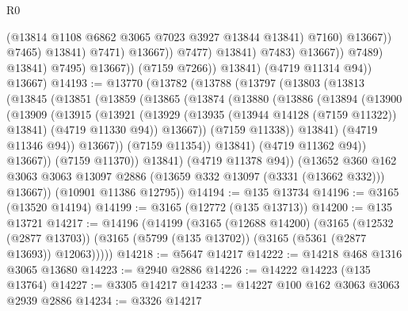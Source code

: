 \begin{lexlean}{R0}
\begin{coremodule}
                                                (@13814 @1108 @6862 @3065 @7023 @3927 @13844 @13841)
                                                @7160)
                                              @13667))
                                          @7465)
                                        @13841)
                                      @7471)
                                    @13667))
                                @7477)
                              @13841)
                            @7483)
                          @13667))
                      @7489)
                    @13841)
                  @7495)
                @13667))
            (@7159 @7266))
          @13841)
        (@4719 @11314 @94))
      @13667)
@14193 := @13770
    (@13782
      (@13788
        (@13797
          (@13803
            (@13813
              (@13845
                (@13851
                  (@13859
                    (@13865
                      (@13874
                        (@13880
                          (@13886
                            (@13894
                              (@13900
                                (@13909
                                  (@13915
                                    (@13921
                                      (@13929
                                        (@13935 (@13944 @14128 (@7159 @11322)) @13841)
                                        (@4719 @11330 @94))
                                      @13667))
                                  (@7159 @11338))
                                @13841)
                              (@4719 @11346 @94))
                            @13667))
                        (@7159 @11354))
                      @13841)
                    (@4719 @11362 @94))
                  @13667))
              (@7159 @11370))
            @13841)
          (@4719 @11378 @94))
        (@13652
          @360
          @162
          @3063
          @3063
          @13097
          @2886
          (@13659 @332 @13097 (@3331 (@13662 @332)))
          @13667))
      (@10901 @11386 @12795))
@14194 := @135 @13734
@14196 := @3165 (@13520 @14194)
@14199 := @3165 (@12772 (@135 @13713))
@14200 := @135 @13721
@14217 := @14196
    (@14199
      (@3165
        (@12688 @14200)
        (@3165
          (@12532 (@2877 @13703))
          (@3165 (@5799 (@135 @13702)) (@3165 (@5361 (@2877 @13693)) @12063)))))
@14218 := @5647 @14217
@14222 := @14218 @468 @1316 @3065 @13680
@14223 := @2940 @2886
@14226 := @14222 @14223 (@135 @13764)
@14227 := @3305 @14217
@14233 := @14227 @100 @162 @3063 @3063 @2939 @2886
@14234 := @3326 @14217

\end{coremodule}
\end{lexlean}
